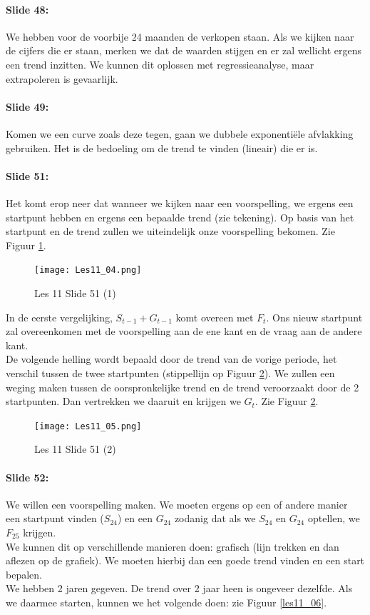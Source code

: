 \documentclass[10pt,a4paper]{report}
\begin{document}
\paragraph{Slide 48:} We hebben voor de voorbije 24 maanden de verkopen staan. Als we kijken naar de cijfers die er staan, merken we dat de waarden stijgen en er zal wellicht ergens een trend inzitten. We kunnen dit oplossen met regressieanalyse, maar extrapoleren is gevaarlijk.

\paragraph{Slide 49:} Komen we een curve zoals deze tegen, gaan we dubbele exponenti\"ele afvlakking gebruiken. Het is de bedoeling om de trend te vinden (lineair) die er is.

\paragraph{Slide 51:} Het komt erop neer dat wanneer we kijken naar een voorspelling, we ergens een startpunt hebben en ergens een bepaalde trend (zie tekening). Op basis van het startpunt en de trend zullen we uiteindelijk onze voorspelling bekomen. Zie Figuur \ref{les11_04}.\\

\begin{figure}[h!]
\centering
\texttt{[image: Les11\_04.png]}
\caption{Les 11 Slide 51 (1)} 
\label{les11_04}
\end{figure}

In de eerste vergelijking, $S_{t-1} + G_{t-1}$ komt overeen met $F_{t}$. Ons nieuw startpunt zal overeenkomen met de voorspelling aan de ene kant en de vraag aan de andere kant.\\
De volgende helling wordt bepaald door de trend van de vorige periode, het verschil tussen de twee startpunten (stippellijn op Figuur \ref{les11_05}). We zullen een weging maken tussen de oorspronkelijke trend en de trend veroorzaakt door de 2 startpunten. Dan vertrekken we daaruit en krijgen we $G_{t}$. Zie Figuur \ref{les11_05}.

\begin{figure}[h!]
\centering
\texttt{[image: Les11\_05.png]}
\caption{Les 11 Slide 51 (2)} 
\label{les11_05}
\end{figure}

\paragraph{Slide 52:} We willen een voorspelling maken. We moeten ergens op een of andere manier een startpunt vinden ($S_{24}$) en een $G_{24}$ zodanig dat als we $S_{24}$ en $G_{24}$ optellen, we $F_{25}$ krijgen.\\
We kunnen dit op verschillende manieren doen: grafisch (lijn trekken en dan aflezen op de grafiek). We moeten hierbij dan een goede trend vinden en een start bepalen.\\
We hebben 2 jaren gegeven. De trend over 2 jaar heen is ongeveer dezelfde. Als we daarmee starten, kunnen we het volgende doen: zie Figuur \ref{les11_06}.\\
\end{document}
